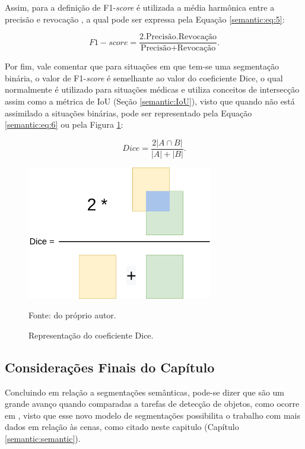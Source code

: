 Assim, para a definição de F1-\textit{score} é utilizada a média harmônica entre a precisão e revocação \cite{Minaee2021}, a qual pode ser expressa pela Equação \ref{semantic:eq:5}:

\begin{equation}
    \label{semantic:eq:5}
    F1-score = \frac{2 . \text{Precisão} . \text{Revocação}}{\text{Precisão} + \text{Revocação}}.
\end{equation}

Por fim, vale comentar que para situações em que tem-se uma segmentação binária, o valor de F1-\textit{score} é semelhante ao valor do coeficiente Dice, o qual normalmente é utilizado para situações médicas \cite{Minaee2021} e utiliza conceitos de intersecção assim como a métrica de IoU (Seção \ref{semantic:IoU}), visto que quando não está assimilado a situações binárias, pode ser representado pela Equação \ref{semantic:eq:6} ou pela Figura \ref{semantic:fig:2}:

\begin{equation}
    \label{semantic:eq:6}
    Dice = \frac{2|A \cap B|}{|A| + |B|}.
\end{equation}

\begin{figure}[H]
    \centering
    \caption{Representação do coeficiente Dice.}
    \includegraphics[height=2.3in]{recursos/imagens/semantic/dice.png}
    \label{semantic:fig:2}

    Fonte: do próprio autor.
\end{figure}


\subsection{Considerações Finais do Capítulo}
\label{semantic:conclusion}
Concluindo em relação a segmentações semânticas, pode-se dizer que são um grande avanço quando comparadas a tarefas de detecção de objetos, como ocorre em \cite{Vaillant1994}, visto que esse novo modelo de segmentações possibilita o trabalho com mais dados em relação às cenas, como citado neste capitulo (Capítulo \ref{semantic:semantic}).

